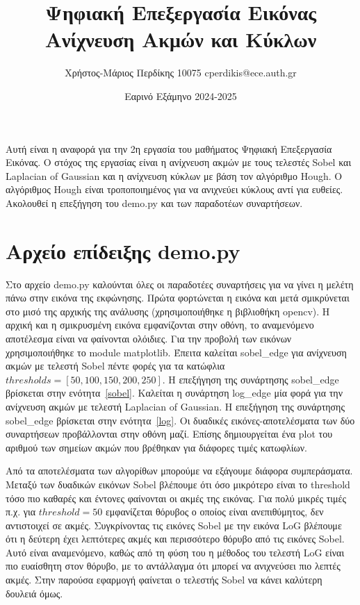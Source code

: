 \documentclass{article}
\title{Ψηφιακή Επεξεργασία Εικόνας \\ Ανίχνευση Ακμών και Κύκλων}
\date{Εαρινό Εξάμηνο 2024-2025}
\author{Χρήστος-Μάριος Περδίκης 10075 cperdikis@ece.auth.gr}
\begin{document}
\maketitle

Αυτή είναι η αναφορά για την 2η εργασία του μαθήματος Ψηφιακή Επεξεργασία 
Εικόνας. Ο στόχος της εργασίας είναι η ανίχνευση ακμών με τους τελεστές Sobel
και Laplacian of Gaussian και η ανίχνευση κύκλων με βάση τον αλγόριθμο Hough.
O αλγόριθμος Hough είναι τροποποιημένος για να ανιχνεύει κύ\-κλους αντί για 
ευθείες. Ακολουθεί η επεξήγηση του demo.py και των παραδοτέων συναρτήσεων.

\section{Αρχείο επίδειξης demo.py}
Στο αρχείο demo.py καλούνται όλες οι παραδοτέες συναρτήσεις για να γίνει η 
μελέτη πάνω στην εικόνα της εκφώνησης. Πρώτα φορτώνεται η εικόνα και μετά 
σμικρύνεται στο μισό της αρχικής της ανάλυσης (χρησιμοποιήθηκε η βιβλιοθήκη
opencv). Η αρχική και η σμικρυσμένη εικόνα εμφανίζονται στην οθόνη, το αναμενόμενο 
αποτέλεσμα είναι να φαίνονται ολόιδιες. Για την προβολή των εικόνων 
χρησιμοποιήθηκε το module matplotlib. Έπειτα καλείται sobel\_edge για ανίχνευση ακμών 
με τελεστή Sobel πέντε φορές για τα κατώφλια $thresholds = \left[50,100,150,
200,250\right]$. Η επεξήγηση της συνάρτησης sobel\_edge βρίσκεται στην 
ενότητα~\ref{sobel}. Καλείται η συνάρτηση log\_edge μία φορά για την ανίχνευση ακμών με
τελεστή Laplacian of Gaussian. Η επεξήγηση της συνάρτησης sobel\_edge βρίσκεται στην 
ενότητα~\ref{log}. Οι δυαδικές εικόνες-αποτελέσματα των δύο συναρτήσεων 
προβάλλονται στην οθόνη μαζί. Επίσης δημιουργείται
ένα plot του αριθμού των σημείων ακμών που βρέθηκαν για διάφορες τιμές κατωφλίων. 

Από τα αποτελέσματα των αλγορίθων μπορούμε να εξάγουμε διάφορα συμπεράσματα. 
Μεταξύ των δυαδικών εικόνων Sobel βλέπουμε ότι όσο μικρότερο είναι το threshold
τόσο πιο καθαρές και έντονες φαίνονται οι ακμές της εικόνας. Για πολύ μικρές τιμές 
π.χ. για $threshold = 50$ εμφανίζεται θόρυβος ο οποίος είναι ανεπιθύμητος, δεν 
αντιστοιχεί σε ακμές. Συγκρίνοντας τις εικόνες Sobel με την εικόνα LoG βλέπουμε
ότι η δεύτερη έχει λεπτότερες ακμές και περισσότερο θόρυβο από τις εικόνες 
Sobel. Αυτό είναι αναμενόμενο, καθώς από τη φύση του η μέθοδος του τελεστή LoG
είναι πιο ευαίσθητη στον θόρυβο, με το αντάλλαγμα ότι μπορεί να ανιχνεύσει πιο 
λεπτές ακμές. Στην παρούσα εφαρμογή φαίνεται ο τελεστής Sobel να κάνει καλύτερη
δουλειά όμως.
\end{document}
